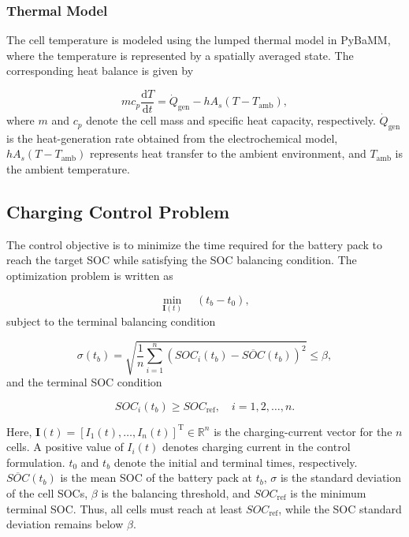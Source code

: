 \subsubsection{Thermal Model}

The cell temperature is modeled using the lumped thermal model in PyBaMM, where the temperature is represented by a spatially averaged state. The corresponding heat balance is given by

\begin{equation}\label{eq:thermal}
    m c_p \frac{\mathrm{d}T}{\mathrm{d}t}
    =
    \dot{Q}_{\mathrm{gen}}
    -
    hA_s\left(T-T_{\mathrm{amb}}\right),
\end{equation}
where $m$ and $c_p$ denote the cell mass and specific heat capacity, respectively.
$\dot{Q}_{\mathrm{gen}}$ is the heat-generation rate obtained from the electrochemical model, $hA_s(T-T_{\mathrm{amb}})$ represents heat transfer to the ambient environment, and $T_{\mathrm{amb}}$ is the ambient temperature.

\subsection{Charging Control Problem}

The control objective is to minimize the time required for the battery pack to reach the target SOC while satisfying the SOC balancing condition. The optimization problem is written as

\begin{equation}\label{eq:balancing_objective}
    \min_{\mathbf{I}(t)} \quad \left(t_b-t_0\right),
\end{equation}
subject to the terminal balancing condition

\begin{equation}\label{eq:terminal_balance}
    \sigma(t_b)
    =
    \sqrt{
        \frac{1}{n}
        \sum_{i=1}^{n}
        \left(
            SOC_i(t_b)-\overline{SOC}(t_b)
        \right)^2
    }
    \leq \beta,
\end{equation}
and the terminal SOC condition

\begin{equation}\label{eq:terminal_soc}
    SOC_i(t_b)\geq SOC_{\mathrm{ref}},
    \quad i=1,2,\ldots,n.
\end{equation}

Here,
$   \mathbf{I}(t)
    =
    \left[
    I_1(t),\ldots,I_n(t)
    \right]^{\mathrm{T}}
    \in \mathbb{R}^{n}$
is the charging-current vector for the $n$ cells. A positive value of $I_i(t)$ denotes charging current in the control formulation.
$t_0$ and $t_b$ denote the initial and terminal times, respectively.
$\overline{SOC}(t_b)$ is the mean SOC of the battery pack at $t_b$, $\sigma$ is the standard deviation of the cell SOCs, $\beta$ is the balancing threshold, and $SOC_{\mathrm{ref}}$ is the minimum terminal SOC. Thus, all cells must reach at least $SOC_{\mathrm{ref}}$, while the SOC standard deviation remains below $\beta$.


